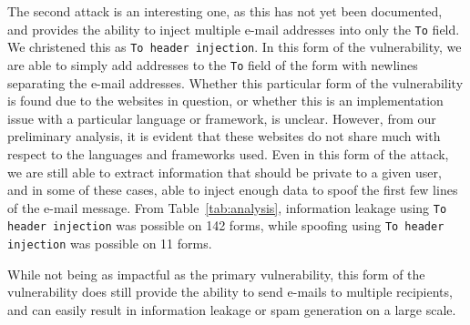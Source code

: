     The second attack is an interesting one, as this has not yet been documented, and provides the ability to inject multiple e-mail addresses into only the \texttt{To} field. We christened this as \texttt{To header injection}. In this form of the vulnerability, we are able to simply add addresses to the \texttt{To} field of the form with newlines separating the e-mail addresses. Whether this particular form of the vulnerability is found due to the websites in question, or whether this is an implementation issue with a particular language or framework, is unclear. However, from our preliminary analysis, it is evident that these websites do not share much with respect to the languages and frameworks used. 
    Even in this form of the attack, we are still able to extract information that should be private to a given user, and in some of these cases, able to inject enough data to spoof the first few lines of the e-mail message. From Table~\ref{tab:analysis}, information leakage using \texttt{To header injection} was possible on 142 forms, while spoofing using \texttt{To header injection} was possible on 11 forms.
    
    While not being as impactful as the primary vulnerability, this form of the vulnerability does still provide the ability to send e-mails to multiple recipients, and can easily result in information leakage or spam generation on a large scale.
    
